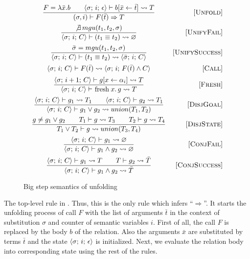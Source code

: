 \begin{figure}[h!]
\[\begin{array}{cr}

\dfrac{ F = \lambda \bar{x}. b \qquad \inbr{\sigma;\, i;\, \epsilon} \vdash b[\bar{x} \leftarrow \bar{t}] \leadsto T}
      {(\sigma, i) \vdash F(\bar{t}) \Rightarrow T}
&     \ruleno{Unfold} \\[4mm]
\dfrac{\not\exists \, mgu(t_1, t_2, \sigma)}
      {\inbr{\sigma;\, i;\, C} \vdash (t_1 \equiv t_2) \leadsto \emptyset}
&     \ruleno{UnifyFail}  \\[4mm]
\dfrac{\bar\sigma = mgu(t_1, t_2, \sigma)}
      {\inbr{\sigma;\, i;\, C} \vdash (t_1 \equiv t_2) \leadsto \inbr{\bar\sigma;\, i;\, C}}
&     \ruleno{UnifySuccess}  \\[4mm]
      {\inbr{\sigma;\, i;\, C} \vdash F(\bar{t}) \leadsto \inbr{\sigma;\, i;\, F(\bar{t}) \land C}}
&     \ruleno{Call} \\[2mm]
\dfrac{\inbr{\sigma;\, i+1;\, C} \vdash g[x \leftarrow \alpha_i] \leadsto T}
      {\inbr{\sigma;\, i;\, C} \vdash \mbox{\lstinline|fresh|} \, x. \, g \leadsto T}
&     \ruleno{Fresh}  \\[4mm]
\dfrac{\inbr{\sigma;\, i;\, C} \vdash g_1 \leadsto T_1 \qquad \inbr{\sigma;\, i;\, C} \vdash g_2 \leadsto T_1}
      {\inbr{\sigma;\, i;\, C} \vdash g_1 \lor g_2 \leadsto union(T_1, T_2)}
&     \ruleno{DisjGoal}  \\[4mm]
\dfrac{g \not= g_1 \lor g_2 \qquad T_1 \vdash g \leadsto T_3 \qquad T_2 \vdash g \leadsto T_4}
      {T_1 \lor T_2 \vdash g \leadsto union(T_3, T_4)}
&     \ruleno{DisjState}  \\[4mm]
\dfrac{\inbr{\sigma;\, i;\, C} \vdash g_1 \leadsto \emptyset}
      {\inbr{\sigma;\, i;\, C} \vdash g_1 \land g_2 \leadsto \emptyset}
&     \ruleno{ConjFail}  \\[4mm]
\dfrac{\inbr{\sigma;\, i;\, C} \vdash g_1 \leadsto T \qquad T \vdash g_2 \leadsto \bar{T}}
      {\inbr{\sigma;\, i;\, C} \vdash g_1 \land g_2 \leadsto \bar{T}}
&     \ruleno{ConjSuccess}
\end{array}\]

\caption{Big step semantics of unfolding}
\label{fair:unfolding-semantics}
\end{figure}

The top-level rule in . Thus, this is the only rule which infers ``$\Rightarrow$''. It starts the unfolding process of call $F$
with the list of arguments $\bar{t}$ in the context of substitution $\sigma$ and counter of semantic variables $i$.
First of all, the call $F$ is replaced by the body $b$ of the relation. Also the arguments $\bar{x}$ are substituted by terms $\bar{t}$ and
the state $\langle \sigma;\, i;\, \epsilon \rangle$ is initialized. Next, we evaluate the relation body into corresponding state using the rest of the rules.

